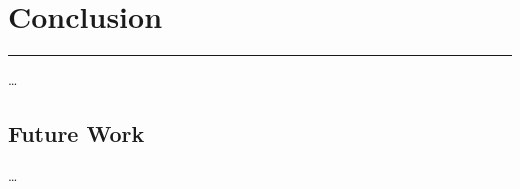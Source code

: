 \chapter{Conclusion}

\lhead{}

\vspace{-1.6cm}
\begingroup
\color{gray}
\par\noindent\rule{\textwidth}{0.4pt}
\endgroup


\ldots


\section{Future Work}

\ldots
